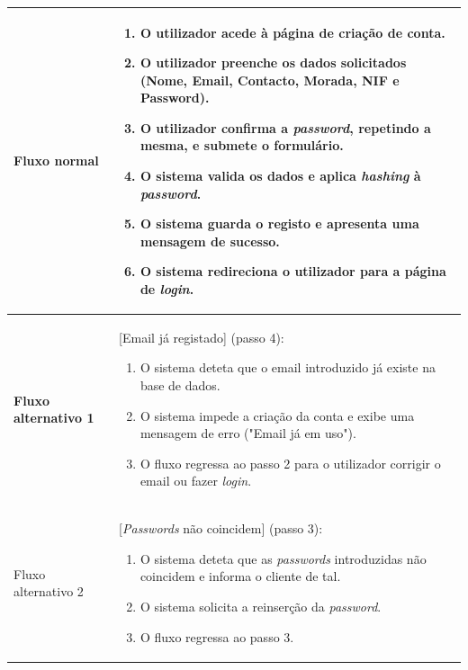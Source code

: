 \documentclass[a4paper,12pt]{scrreprt}
\begin{document}
\begin{longtable}{|>{\columncolor{black!10}\bfseries}p{3.5cm}|p{11.5cm}|}
Fluxo normal & 
\begin{enumerate}[leftmargin=*, nosep, topsep=2pt, partopsep=0pt]
    \item O utilizador acede à página de criação de conta.
    \item O utilizador preenche os dados solicitados (Nome, Email, Contacto, Morada, NIF e Password).
    \item O utilizador confirma a \textit{password}, repetindo a mesma, e submete o formulário.
    \item O sistema valida os dados e aplica \textit{hashing} à \textit{password}.
    \item O sistema guarda o registo e apresenta uma mensagem de sucesso.
    \item O sistema redireciona o utilizador para a página de \textit{login}.
\end{enumerate} \\ \hline

Fluxo alternativo 1 & [Email já registado] (passo 4):
\begin{enumerate}[label=4.\arabic*., leftmargin=*, nosep, topsep=2pt, partopsep=0pt]
    \item O sistema deteta que o email introduzido já existe na base de dados.
    \item O sistema impede a criação da conta e exibe uma mensagem de erro ("Email já em uso").
    \item O fluxo regressa ao passo 2 para o utilizador corrigir o email ou fazer \textit{login}.
\end{enumerate} \\ \hline

Fluxo alternativo 2 & [\textit{Passwords} não coincidem] (passo 3):
\begin{enumerate}[label=3.\arabic*., leftmargin=*, nosep, topsep=2pt, partopsep=0pt]
    \item O sistema deteta que as \textit{passwords} introduzidas não coincidem e informa o cliente de tal.
    \item O sistema solicita a reinserção da \textit{password}.
    \item O fluxo regressa ao passo 3.
\end{enumerate} \\ \hline

\end{longtable}
\end{document}
